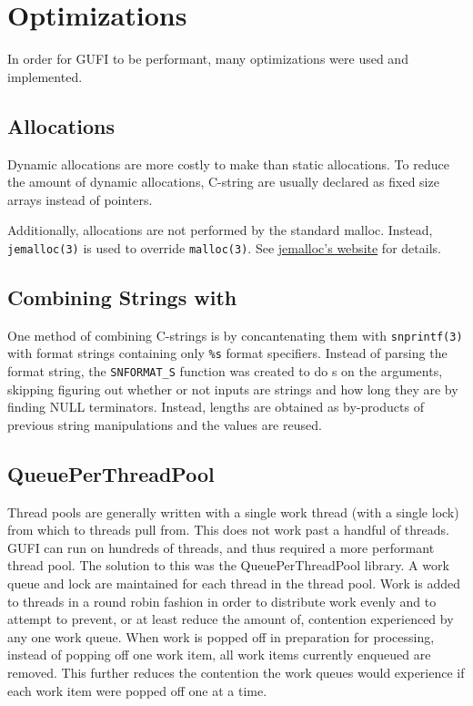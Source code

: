 \section{Optimizations}
In order for GUFI to be performant, many optimizations were used and
implemented.

\subsection{Allocations}
Dynamic allocations are more costly to make than static
allocations. To reduce the amount of dynamic allocations, C-string are
usually declared as fixed size arrays instead of pointers.

Additionally, allocations are not performed by the standard
malloc. Instead, \texttt{jemalloc(3)} is used to override
\texttt{malloc(3)}. See \href{https://jemalloc.net/}{jemalloc's
  website} for details.

\subsection{Combining Strings with \memcpy}
One method of combining C-strings is by concantenating them with
\texttt{snprintf(3)} with format strings containing only \texttt{\%s}
format specifiers. Instead of parsing the format string, the
\texttt{SNFORMAT\_S} function was created to do \memcpy s on
the arguments, skipping figuring out whether or not inputs are strings
and how long they are by finding NULL terminators. Instead, lengths are
obtained as by-products of previous string manipulations and the
values are reused.

\subsection{QueuePerThreadPool}
Thread pools are generally written with a single work thread (with a
single lock) from which to threads pull from. This does not work past
a handful of threads. GUFI can run on hundreds of threads, and thus
required a more performant thread pool. The solution to this was the
QueuePerThreadPool library. A work queue and lock are maintained for
each thread in the thread pool. Work is added to threads in a round
robin fashion in order to distribute work evenly and to attempt to
prevent, or at least reduce the amount of, contention experienced by any
one work queue. When work is popped off in preparation for processing,
instead of popping off one work item, all work items currently
enqueued are removed. This further reduces the contention the work
queues would experience if each work item were popped off one at a
time.

